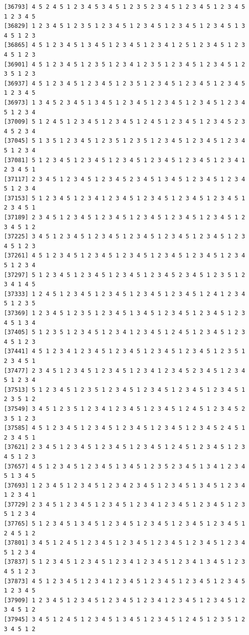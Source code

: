 \documentclass[
  11pt,
]{book}
\begin{document}
\begin{verbatim}
[36793] 4 5 2 4 5 1 2 3 4 5 3 4 5 1 2 3 5 2 3 4 5 1 2 3 4 5 1 2 3 4 5 1 2 3 4 5
[36829] 1 2 3 4 5 1 2 3 5 1 2 3 4 5 1 2 3 4 5 1 2 3 4 5 1 2 3 4 5 1 3 4 5 1 2 3
[36865] 4 5 1 2 3 4 5 1 3 4 5 1 2 3 4 5 1 2 3 4 1 2 5 1 2 3 4 5 1 2 3 4 5 1 2 3
[36901] 4 5 1 2 3 4 5 1 2 3 5 1 2 3 4 1 2 3 5 1 2 3 4 5 1 2 3 4 5 1 2 3 5 1 2 3
[36937] 4 5 1 2 3 4 5 1 2 3 4 5 1 2 3 5 1 2 3 4 5 1 2 3 4 5 1 2 3 4 5 1 2 3 4 5
[36973] 1 3 4 5 2 3 4 5 1 3 4 5 1 2 3 4 5 1 2 3 4 5 1 2 3 4 5 1 2 3 4 5 1 2 3 4
[37009] 5 1 2 4 5 1 2 3 4 5 1 2 3 4 5 1 2 4 5 1 2 3 4 5 1 2 3 4 5 2 3 4 5 2 3 4
[37045] 5 1 3 5 1 2 3 4 5 1 2 3 5 1 2 3 5 1 2 3 4 5 1 2 3 4 5 1 2 3 4 5 1 2 3 4
[37081] 5 1 2 3 4 5 1 2 3 4 5 1 2 3 4 5 1 2 3 4 5 1 2 3 4 5 1 2 3 4 1 2 3 4 5 1
[37117] 2 3 4 5 1 2 3 4 5 1 2 3 4 5 2 3 4 5 1 3 4 5 1 2 3 4 5 1 2 3 4 5 1 2 3 4
[37153] 5 1 2 3 4 5 1 2 3 4 1 2 3 4 5 1 2 3 4 5 1 2 3 4 5 1 2 3 4 5 1 2 3 4 5 1
[37189] 2 3 4 5 1 2 3 4 5 1 2 3 4 5 1 2 3 4 5 1 2 3 4 5 1 2 3 4 5 1 2 3 4 5 1 2
[37225] 3 4 5 1 2 3 4 5 1 2 3 4 5 1 2 3 4 5 1 2 3 4 5 1 2 3 4 5 1 2 3 4 5 1 2 3
[37261] 4 5 1 2 3 4 5 1 2 3 4 5 1 2 3 4 5 1 2 3 4 5 1 2 3 4 5 1 2 3 4 5 1 2 3 4
[37297] 5 1 2 3 4 5 1 2 3 4 5 1 2 3 4 5 1 2 3 4 5 2 3 4 5 1 2 3 5 1 2 3 4 1 4 5
[37333] 1 2 4 5 1 2 3 4 5 1 2 3 4 5 1 2 3 4 5 1 2 3 4 5 1 2 4 1 2 3 4 5 1 2 3 5
[37369] 1 2 3 4 5 1 2 3 5 1 2 3 4 5 1 3 4 5 1 2 3 4 5 1 2 3 4 5 1 2 3 4 5 1 3 4
[37405] 5 1 2 3 5 1 2 3 4 5 1 2 3 4 1 2 3 4 5 1 2 4 5 1 2 3 4 5 1 2 3 4 5 1 2 3
[37441] 4 5 1 2 3 4 1 2 3 4 5 1 2 3 4 5 1 2 3 4 5 1 2 3 4 5 1 2 3 5 1 2 3 4 5 1
[37477] 2 3 4 5 1 2 3 4 5 1 2 3 4 5 1 2 3 4 1 2 3 4 5 2 3 4 5 1 2 3 4 5 1 2 3 4
[37513] 5 1 2 3 4 5 1 2 3 5 1 2 3 4 5 1 2 3 4 5 1 2 3 4 5 1 2 3 4 5 1 2 3 5 1 2
[37549] 3 4 5 1 2 3 5 1 2 3 4 1 2 3 4 5 1 2 3 4 5 1 2 4 5 1 2 3 4 5 2 3 5 1 2 3
[37585] 4 5 1 2 3 4 5 1 2 3 4 5 1 2 3 4 5 1 2 3 4 5 1 2 3 4 5 2 4 5 1 2 3 4 5 1
[37621] 2 3 4 5 1 2 3 4 5 1 2 3 4 5 1 2 3 4 5 1 2 4 5 1 2 3 4 5 1 2 3 4 5 1 2 3
[37657] 4 5 1 2 3 4 5 1 2 3 4 5 1 3 4 5 1 2 3 5 2 3 4 5 1 3 4 1 2 3 4 5 1 3 4 5
[37693] 1 2 3 4 5 1 2 3 4 5 1 2 3 4 2 3 4 5 1 2 3 4 5 1 3 4 5 1 2 3 4 1 2 3 4 1
[37729] 2 3 4 5 1 2 3 4 5 1 2 3 4 5 1 2 3 4 1 2 3 4 5 1 2 3 4 5 1 2 3 5 1 2 3 4
[37765] 5 1 2 3 4 5 1 3 4 5 1 2 3 4 5 1 2 3 4 5 1 2 3 4 5 1 2 3 4 5 1 2 4 5 1 2
[37801] 3 4 5 1 2 4 5 1 2 3 4 5 1 2 3 4 5 1 2 3 4 5 1 2 3 4 5 1 2 3 4 5 1 2 3 4
[37837] 5 1 2 3 4 5 1 2 3 4 5 1 2 3 4 1 2 3 4 5 1 2 3 4 1 3 4 5 1 2 3 4 5 1 2 3
[37873] 4 5 1 2 3 4 5 1 2 3 4 1 2 3 4 5 1 2 3 4 5 1 2 3 4 5 1 2 3 4 5 1 2 3 4 5
[37909] 1 2 3 4 5 1 2 3 4 5 1 2 3 4 5 1 2 3 4 1 2 3 4 5 1 2 3 4 5 1 2 3 4 5 1 2
[37945] 3 4 5 1 2 4 5 1 2 3 4 5 1 3 4 5 1 2 3 4 5 1 2 4 5 1 2 3 5 1 2 3 4 5 1 2

\end{verbatim}
\end{document}
